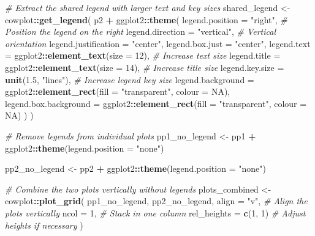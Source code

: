 \documentclass[
]{book}
\newenvironment{Shaded}{\begin{snugshade}}{\end{snugshade}}
\newcommand{\AttributeTok}[1]{\textcolor[rgb]{0.13,0.29,0.53}{#1}}
\newcommand{\CommentTok}[1]{\textcolor[rgb]{0.56,0.35,0.01}{\textit{#1}}}
\newcommand{\ConstantTok}[1]{\textcolor[rgb]{0.56,0.35,0.01}{#1}}
\newcommand{\DecValTok}[1]{\textcolor[rgb]{0.00,0.00,0.81}{#1}}
\newcommand{\FloatTok}[1]{\textcolor[rgb]{0.00,0.00,0.81}{#1}}
\newcommand{\FunctionTok}[1]{\textcolor[rgb]{0.13,0.29,0.53}{\textbf{#1}}}
\newcommand{\NormalTok}[1]{#1}
\newcommand{\OtherTok}[1]{\textcolor[rgb]{0.56,0.35,0.01}{#1}}
\newcommand{\SpecialCharTok}[1]{\textcolor[rgb]{0.81,0.36,0.00}{\textbf{#1}}}
\newcommand{\StringTok}[1]{\textcolor[rgb]{0.31,0.60,0.02}{#1}}
\begin{document}
\begin{Shaded}
\begin{Highlighting}[]
\CommentTok{\# Extract the shared legend with larger text and key sizes}
\NormalTok{shared\_legend }\OtherTok{\textless{}{-}}\NormalTok{ cowplot}\SpecialCharTok{::}\FunctionTok{get\_legend}\NormalTok{(}
\NormalTok{  p2 }\SpecialCharTok{+}
\NormalTok{    ggplot2}\SpecialCharTok{::}\FunctionTok{theme}\NormalTok{(}
      \AttributeTok{legend.position =} \StringTok{"right"}\NormalTok{,                }\CommentTok{\# Position the legend on the right}
      \AttributeTok{legend.direction =} \StringTok{"vertical"}\NormalTok{,           }\CommentTok{\# Vertical orientation}
      \AttributeTok{legend.justification =} \StringTok{"center"}\NormalTok{,}
      \AttributeTok{legend.box.just =} \StringTok{"center"}\NormalTok{,}
      \AttributeTok{legend.text =}\NormalTok{ ggplot2}\SpecialCharTok{::}\FunctionTok{element\_text}\NormalTok{(}\AttributeTok{size =} \DecValTok{12}\NormalTok{),  }\CommentTok{\# Increase text size}
      \AttributeTok{legend.title =}\NormalTok{ ggplot2}\SpecialCharTok{::}\FunctionTok{element\_text}\NormalTok{(}\AttributeTok{size =} \DecValTok{14}\NormalTok{), }\CommentTok{\# Increase title size}
      \AttributeTok{legend.key.size =} \FunctionTok{unit}\NormalTok{(}\FloatTok{1.5}\NormalTok{, }\StringTok{"lines"}\NormalTok{),    }\CommentTok{\# Increase legend key size}
      \AttributeTok{legend.background =}\NormalTok{ ggplot2}\SpecialCharTok{::}\FunctionTok{element\_rect}\NormalTok{(}\AttributeTok{fill =} \StringTok{"transparent"}\NormalTok{, }\AttributeTok{colour =} \ConstantTok{NA}\NormalTok{),}
      \AttributeTok{legend.box.background =}\NormalTok{ ggplot2}\SpecialCharTok{::}\FunctionTok{element\_rect}\NormalTok{(}\AttributeTok{fill =} \StringTok{"transparent"}\NormalTok{, }\AttributeTok{colour =} \ConstantTok{NA}\NormalTok{)}
\NormalTok{    )}
\NormalTok{)}

\CommentTok{\# Remove legends from individual plots}
\NormalTok{pp1\_no\_legend }\OtherTok{\textless{}{-}} 
\NormalTok{  pp1 }\SpecialCharTok{+} 
\NormalTok{  ggplot2}\SpecialCharTok{::}\FunctionTok{theme}\NormalTok{(}\AttributeTok{legend.position =} \StringTok{"none"}\NormalTok{)}

\NormalTok{pp2\_no\_legend }\OtherTok{\textless{}{-}} 
\NormalTok{  pp2 }\SpecialCharTok{+} 
\NormalTok{  ggplot2}\SpecialCharTok{::}\FunctionTok{theme}\NormalTok{(}\AttributeTok{legend.position =} \StringTok{"none"}\NormalTok{)}

\CommentTok{\# Combine the two plots vertically without legends}
\NormalTok{plots\_combined }\OtherTok{\textless{}{-}}\NormalTok{ cowplot}\SpecialCharTok{::}\FunctionTok{plot\_grid}\NormalTok{(}
\NormalTok{  pp1\_no\_legend,}
\NormalTok{  pp2\_no\_legend,}
  \AttributeTok{align =} \StringTok{"v"}\NormalTok{,          }\CommentTok{\# Align the plots vertically}
  \AttributeTok{ncol =} \DecValTok{1}\NormalTok{,             }\CommentTok{\# Stack in one column}
  \AttributeTok{rel\_heights =} \FunctionTok{c}\NormalTok{(}\DecValTok{1}\NormalTok{, }\DecValTok{1}\NormalTok{) }\CommentTok{\# Adjust heights if necessary}
\NormalTok{)}


\end{Highlighting}
\end{Shaded}
\end{document}
